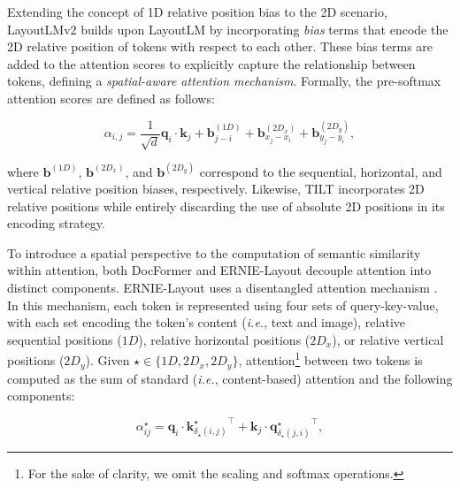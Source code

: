 Extending the concept of 1D relative position bias \citep{raffel2020exploring} to the 2D scenario, LayoutLMv2 \citep{xu2020layoutlmv2} builds upon LayoutLM by incorporating \textit{bias} terms that encode the 2D relative position of tokens with respect to each other. These bias terms are added to the attention scores to explicitly capture the relationship between tokens, defining a \textit{spatial-aware attention mechanism}. Formally, the pre-softmax attention scores are defined as follows:

\begin{equation}
    \alpha_{i,j} = \dfrac{1}{\sqrt{d}} \bm{q}_i \cdot \bm{k}_j + \bm{b}^{(1D)}_{j - i} + \bm{b}^{(2D_x)}_{x_j - x_i} + \bm{b}^{(2D_y)}_{y_j - y_i},
\end{equation}

\noindent where $\bm{b}^{(1D)}$, $\bm{b}^{(2D_x)}$, and $\bm{b}^{(2D_y)}$ correspond to the sequential, horizontal, and vertical relative position biases, respectively. Likewise, TILT \citep{powalski2021going} incorporates 2D relative positions while entirely discarding the use of absolute 2D positions in its encoding strategy. 

To introduce a spatial perspective to the computation of semantic similarity within attention, both DocFormer \citep{appalaraju2021docformer} and ERNIE-Layout \citep{peng2022ernie} decouple attention into distinct components. 
ERNIE-Layout uses a disentangled attention mechanism \citep{he2020deberta}. In this mechanism, each token is represented using four sets of query-key-value, with each set encoding the token's content (\textit{i.e.}, text and image), relative sequential positions ($1D$), relative horizontal positions ($2D_x$), or relative vertical positions ($2D_y$). Given $\star \in \{1D, 2D_x, 2D_y\}$, attention\footnote{For the sake of clarity, we omit the scaling and softmax operations.} between two tokens is computed as the sum of standard (\textit{i.e.}, content-based) attention and the following components: 

\begin{equation}
        \alpha^{\star}_{ij} = \bm{q}_i \cdot {\bm{k}^{\star}_{\delta_{\star}(i, j)}}^{\top} + \bm{k}_j \cdot {\bm{q}^{\star}_{\delta_{\star}(j, i)}}^{\top},
\label{equation:ernie-layout-attention}
\end{equation}


